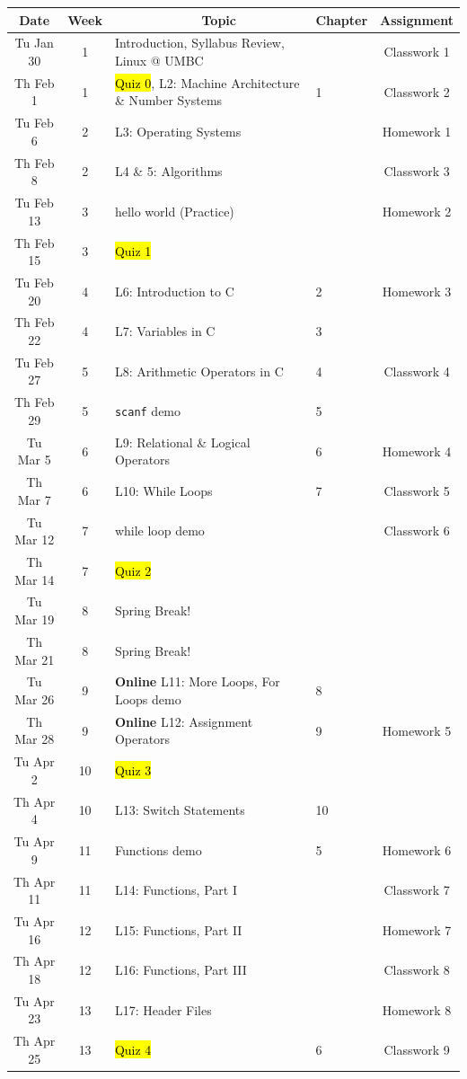\documentclass[letter,11pt]{article}
\begin{document}
\small
\begin{tabular}{c c l l c}
Date & Week & ~~~~~~~~~~~~Topic & Chapter & Assignment \\
\hline
Tu Jan 30  & 1 & Introduction, Syllabus Review, Linux @ UMBC & & Classwork 1  \\ \hline

Th Feb 1  & 1 & \hl{Quiz 0}, L2: Machine Architecture \& Number Systems & 1 & Classwork 2 \\
Tu Feb 6  & 2 & L3: Operating Systems & & Homework 1 \\
Th Feb 8 & 2 & L4 \& 5: Algorithms & & Classwork 3 \\
Tu Feb 13 & 3 & hello world (Practice) & & Homework 2 \\
Th Feb 15 & 3 & \hl{Quiz 1} & &  \\
Tu Feb 20 & 4 & L6: Introduction to C & 2 & Homework 3\\
Th Feb 22 & 4 & L7: Variables in C & 3 \\
Tu Feb 27 & 5 & L8: Arithmetic Operators in C & 4 & Classwork 4 \\
Th Feb 29 & 5 & \texttt{scanf} demo & 5 &  \\ \hline

Tu Mar 5 & 6 & L9: Relational \& Logical Operators & 6 & Homework 4 \\
Th Mar 7 & 6 & L10: While Loops & 7 & Classwork 5 \\
Tu Mar 12 & 7 & while loop demo & & Classwork 6 \\
Th Mar 14 & 7 & \hl{Quiz 2} & & \\
Tu Mar 19 & 8 & {\color{cadmiumgreen}Spring Break!} & & \\
Th Mar 21 & 8 & {\color{cadmiumgreen}Spring Break!} & &  \\
Tu Mar 26 & 9 & \textbf{Online} L11: More Loops, For Loops demo & 8 &  \\
Th Mar 28 & 9 & \textbf{Online} L12: Assignment Operators & 9 & Homework 5\\ \hline

Tu Apr 2 & 10 & \hl{Quiz 3} & & \\
Th Apr 4 & 10 & L13: Switch Statements & 10 & \\
Tu Apr 9 & 11 & Functions demo & 5 & Homework 6\\
Th Apr 11 & 11 & L14: Functions, Part I & & Classwork 7  \\
Tu Apr 16 & 12 & L15: Functions, Part II & &  Homework 7 \\
Th Apr 18 & 12 & L16: Functions, Part III  & & Classwork 8 \\
Tu Apr 23 & 13 & L17: Header Files & & Homework 8\\
Th Apr 25 & 13 & \hl{Quiz 4} & 6 & Classwork 9 \\ \hline


\end{tabular}
\end{document}
